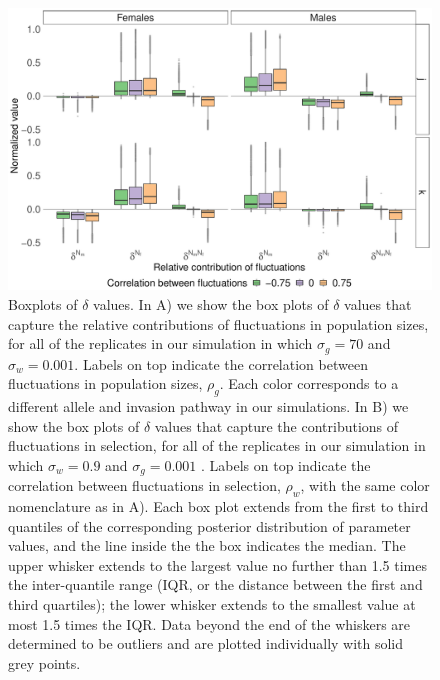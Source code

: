 \documentclass[12pt]{article}
\begin{document}
\begin{figure}[H]
  \centerline{\includegraphics[width=1\textwidth]{box_plots.pdf}}
  \caption{ Boxplots of $\delta$ values. In A) we show the box plots of $\delta$ values that capture the relative contributions of fluctuations in population sizes, for all of the replicates in our simulation in which $\sigma_{g}=70$ and $\sigma_{w}=0.001$. Labels on top indicate the correlation between fluctuations in population sizes, $\rho_{g}$. Each color corresponds to a different allele and invasion pathway in our simulations. In B) we show the box plots of $\delta$ values that capture the contributions of fluctuations in selection, for all of the replicates in our simulation in which $\sigma_{w}=0.9$ and $\sigma_{g}=0.001$ . Labels on top indicate the correlation between fluctuations in selection, $\rho_{w}$, with the same color nomenclature as in A). Each box plot extends from the first to third quantiles of the corresponding posterior distribution of parameter values, and the line inside the the box indicates the median. The upper whisker extends to the largest value no further than 1.5 times the inter-quantile range (IQR, or the distance between the first and third quartiles); the lower whisker extends to the smallest value at most 1.5 times the IQR. Data beyond the end of the whiskers are determined to be outliers and are plotted individually with solid grey points.   }
    \label{fig:boxes}
\end{figure}
\end{document}
